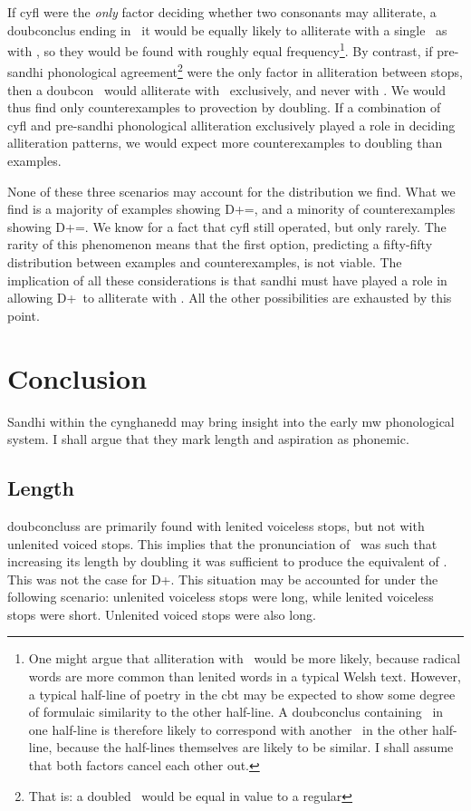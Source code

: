 If \gls{cyfl} were the \emph{only} factor deciding whether two consonants may alliterate, a \gls{doubconclus} ending in \lT\ it would be equally likely to alliterate with a single \lT\ as with \xT, so they would be found with  roughly equal frequency\footnote{One might argue that alliteration with \xT\ would be more likely, because radical words are more common than lenited words in a typical Welsh text. However, a typical half-line of poetry in the \gls{cbt} may be expected to show some degree of formulaic similarity to the other half-line. A \gls{doubconclus} containing \lT\ in one half-line is therefore likely to correspond with another \lT\ in the other half-line, because the half-lines themselves are likely to be similar. I shall assume that both factors cancel each other out.}.
By contrast, if pre-sandhi phonological agreement\footnote{That is: a doubled \lT\ would be equal in value to a regular \lT} were the only factor in alliteration between stops, then a \gls{doubcon} \lT\ would alliterate with \lT\ exclusively, and never with \xT. We would thus find only counterexamples to provection by doubling. If a combination of \gls{cyfl} and pre-sandhi phonological alliteration exclusively played a role in deciding alliteration patterns, we would expect more counterexamples to doubling than examples.

None of these three scenarios may account for the distribution we find. What we find is a majority of examples showing \gls{D}+\lT=\xT, and a minority of counterexamples showing \gls{D}+\lT=\lT. We know for a fact that \gls{cyfl} still operated, but only rarely. The rarity of this phenomenon means that the first option, predicting a fifty-fifty distribution between examples and counterexamples, is not viable. The implication of all these considerations is that sandhi must have played a role in allowing \gls{D}+\lT\ to alliterate with \xT. All the other possibilities are exhausted by this point. 

\section{Conclusion}
\label{sec:conclusion}
Sandhi within the cynghanedd may bring insight into the early \gls{mw} phonological system. I shall argue that they mark length and aspiration as phonemic. 

\subsection{Length}
\label{sec:length}
\Gls{doubconclus}s are primarily found with lenited voiceless stops, but not with unlenited voiced stops. This implies that the pronunciation of \lT\ was such that increasing its length by doubling it was sufficient to produce the equivalent of \xT. This was not the case for \gls{D}+\xD. This situation may be accounted for under the following scenario: unlenited voiceless stops were long, while lenited voiceless stops were short. Unlenited voiced stops were also long. 

